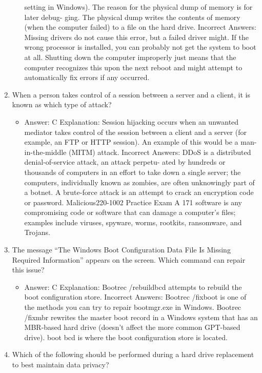 \documentclass{article}
\begin{document}
\begin{enumerate}
\begin{itemize}
setting in Windows). The reason for the physical dump of memory is for later debug-
ging. The physical dump writes the contents of memory (when the computer failed) to
a file on the hard drive.
Incorrect Answers: Missing drivers do not cause this error, but a failed driver might.
If the wrong processor is installed, you can probably not get the system to boot at all.
Shutting down the computer improperly just means that the computer recognizes this
upon the next reboot and might attempt to automatically fix errors if any occurred.
     \end{itemize}
      \item When a person takes control of a session between a server and a
client, it is known as which type of attack?
     \begin{itemize}
         \item Answer: C
Explanation: Session hijacking occurs when an unwanted mediator takes control of
the session between a client and a server (for example, an FTP or HTTP session). An
example of this would be a man-in-the-middle (MITM) attack.
Incorrect Answers: DDoS is a distributed denial-of-service attack, an attack perpetu-
ated by hundreds or thousands of computers in an effort to take down a single server;
the computers, individually known as zombies, are often unknowingly part of a botnet.
A brute-force attack is an attempt to crack an encryption code or password. Malicious220-1002 Practice Exam A
171
software is any compromising code or software that can damage a computer’s files;
examples include viruses, spyware, worms, rootkits, ransomware, and Trojans.
     \end{itemize}
      \item The message “The Windows Boot Configuration Data File Is
Missing Required Information” appears on the screen. Which command
can repair this issue?
     \begin{itemize}
         \item Answer: C
Explanation: Bootrec /rebuildbcd attempts to rebuild the boot configuration store.
Incorrect Answers: Bootrec /fixboot is one of the methods you can try to repair
bootmgr.exe in Windows. Bootrec /fixmbr rewrites the master boot record in a
Windows system that has an MBR-based hard drive (doesn’t affect the more common
GPT-based drive). boot bcd is where the boot configuration store is located.
     \end{itemize}
     \item Which of the following should be performed during a hard drive
replacement to best maintain data privacy?

\end{enumerate}
\end{document}
